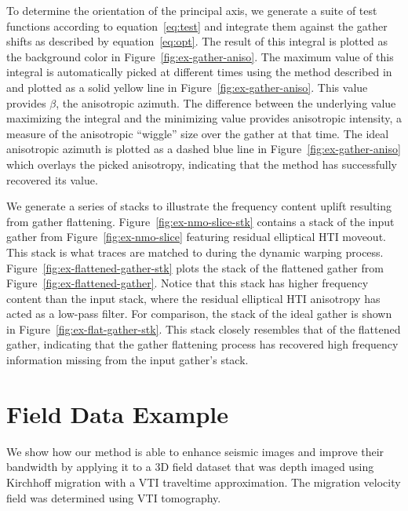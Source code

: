 To determine the orientation of the principal axis, we generate a suite of test functions according to equation~\ref{eq:test} and integrate them against the gather shifts as described by equation~\ref{eq:opt}.  The result of this integral is plotted as the background color in Figure~\ref{fig:ex-gather-aniso}.  The maximum value of this integral is automatically picked at different times using the method described in \cite{fomel-2009} and plotted as a solid yellow line in Figure~\ref{fig:ex-gather-aniso}.  This value provides $\beta$, the anisotropic azimuth.  The difference between the underlying value maximizing the integral and the minimizing value provides anisotropic intensity, a measure of the anisotropic ``wiggle'' size over the gather at that time.  The ideal anisotropic azimuth is plotted as a dashed blue line in Figure~\ref{fig:ex-gather-aniso} which overlays the picked anisotropy, indicating that the method has successfully recovered its value.

We generate a series of stacks to illustrate the frequency content uplift resulting from gather flattening.  Figure~\ref{fig:ex-nmo-slice-stk} contains a stack of the input gather from Figure~\ref{fig:ex-nmo-slice} featuring residual elliptical HTI moveout.  This stack is what traces are matched to during the dynamic warping process.  Figure~\ref{fig:ex-flattened-gather-stk} plots the stack of the flattened gather from Figure~\ref{fig:ex-flattened-gather}.  Notice that this stack has higher frequency content than the input stack, where the residual elliptical HTI anisotropy has acted as a low-pass filter.  For comparison, the stack of the ideal gather is shown in Figure~\ref{fig:ex-flat-gather-stk}.  This stack closely resembles that of the flattened gather, indicating that the gather flattening process has recovered high frequency information missing from the input gather's stack.  


\section{Field Data Example}
We show how our method is able to enhance seismic images and improve their bandwidth by applying it to a 3D field dataset that was depth imaged using Kirchhoff migration with a VTI traveltime approximation. The migration velocity field was determined using VTI tomography.  

